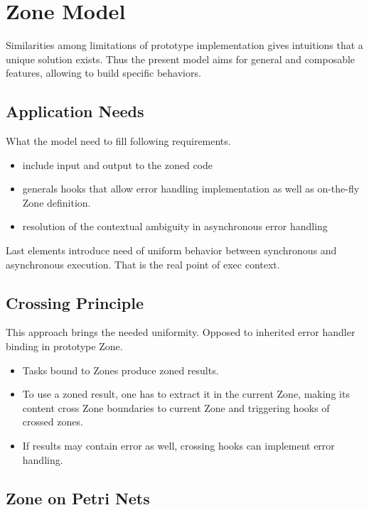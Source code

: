 
\chapter{Zone Model}
\label{ch:zone}

Similarities among limitations of prototype implementation gives intuitions that a unique solution exists. Thus the present model aims for general and composable features, allowing to build specific behaviors.

\section{Application Needs}

What the model need to fill following requirements.

\begin{itemize}
\item include input and output to the zoned code
\item generals hooks that allow error handling implementation as well as on-the-fly Zone definition.
\item resolution of the contextual ambiguity in asynchronous error handling
\end{itemize}

Last elements introduce need of uniform behavior between synchronous and asynchronous execution.
That is the real point of exec context.

\section{Crossing Principle}

This approach brings the needed uniformity. Opposed to inherited error handler binding in prototype Zone.

\begin{itemize}
\item Tasks bound to Zones produce zoned results.
\item To use a zoned result, one has to extract it in the current Zone, making its content cross Zone boundaries to current Zone and triggering hooks of crossed zones.
\item If results may contain error as well, crossing hooks can implement error handling.
\end{itemize}

\section{Zone on Petri Nets}

